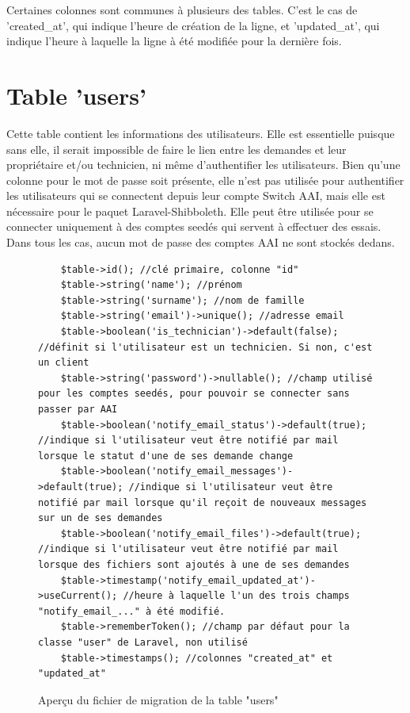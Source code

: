 \documentclass[
    iai, %
    eai, %
]{heig-tb}
\begin{document}
Certaines colonnes sont communes à plusieurs des tables. C'est le cas de 'created\_at', qui indique l'heure de création de la ligne, et 'updated\_at', qui indique l'heure à laquelle la ligne à été modifiée pour la dernière fois.

\section{Table 'users'}
Cette table contient les informations des utilisateurs. Elle est essentielle puisque sans elle, il serait impossible de faire le lien entre les demandes et leur propriétaire et/ou technicien, ni même d'authentifier les utilisateurs.
Bien qu'une colonne pour le mot de passe soit présente, elle n'est pas utilisée pour authentifier les utilisateurs qui se connectent depuis leur compte Switch AAI, mais elle est nécessaire pour le paquet Laravel-Shibboleth. Elle peut être utilisée pour se connecter uniquement à des comptes seedés qui servent à effectuer des essais. Dans tous les cas, aucun mot de passe des comptes AAI ne sont stockés dedans.

\begin{figure}[h]
  \begin{verbatim}
    $table->id(); //clé primaire, colonne "id"
    $table->string('name'); //prénom
    $table->string('surname'); //nom de famille
    $table->string('email')->unique(); //adresse email
    $table->boolean('is_technician')->default(false); //définit si l'utilisateur est un technicien. Si non, c'est un client
    $table->string('password')->nullable(); //champ utilisé pour les comptes seedés, pour pouvoir se connecter sans passer par AAI
    $table->boolean('notify_email_status')->default(true); //indique si l'utilisateur veut être notifié par mail lorsque le statut d'une de ses demande change
    $table->boolean('notify_email_messages')->default(true); //indique si l'utilisateur veut être notifié par mail lorsque qu'il reçoit de nouveaux messages sur un de ses demandes
    $table->boolean('notify_email_files')->default(true); //indique si l'utilisateur veut être notifié par mail lorsque des fichiers sont ajoutés à une de ses demandes
    $table->timestamp('notify_email_updated_at')->useCurrent(); //heure à laquelle l'un des trois champs "notify_email_..." à été modifié.
    $table->rememberToken(); //champ par défaut pour la classe "user" de Laravel, non utilisé
    $table->timestamps(); //colonnes "created_at" et "updated_at"
  \end{verbatim}
  \caption{Aperçu du fichier de migration de la table "users"}
\end{figure}
\end{document}
